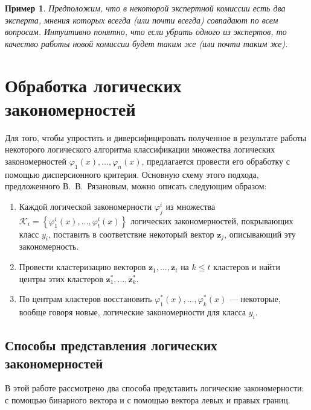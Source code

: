 \documentclass[12pt]{article}
\newtheorem{example}{Пример}
\begin{document}
\begin{example}
  Предположим, что в некоторой экспертной комиссии есть два эксперта,
  мнения которых всегда (или почти всегда) совпадают по всем
  вопросам. Интуитивно понятно, что если убрать одного из экспертов,
  то качество работы новой комиссии будет таким же (или почти таким
  же).
\end{example}

\section{Обработка логических закономерностей}
\label{sec:processing}


Для того, чтобы упростить и диверсифицировать полученное в результате
работы некоторого логического алгоритма классификации множества
логических закономерностей \(\varphi_1(x), \dots, \varphi_n(x)\),
предлагается провести его обработку с помощью дисперсионного критерия.
Основную схему этого подхода, предложенного В.~В.~Рязановым, можно
описать следующим образом:

\begin{enumerate}
\item Каждой логической закономерности \(\varphi_j^i\) из множества
  \(
  \mathcal{K}_{i} = \left\{
  \varphi_1^i(x), \dots, \varphi_t^i(x)
  \right\}
  \)
  логических закономерностей, покрывающих класс \(y_i\), поставить в
  соответствие некоторый вектор \(\bm{z}_j\), описывающий эту
  закономерность.
\item Провести кластеризацию векторов \(\bm{z}_1, \dots, \bm{z}_t\) на
  \(k \leq t\) кластеров и найти центры этих кластеров
  \(\bm{z}_1^*, \dots, \bm{z}_k^*\).
\item По центрам кластеров восстановить \(\varphi_1^*(x), \dots,
  \varphi_k^*(x)\) --- некоторые, вообще говоря новые, логические
  закономерности для класса \(y_i\).
\end{enumerate}

\subsection{Способы представления логических закономерностей}
\label{subsec:representation}
В этой работе рассмотрено два способа представить логические
закономерности: с помощью бинарного вектора и с помощью вектора левых
и правых границ.
\end{document}
